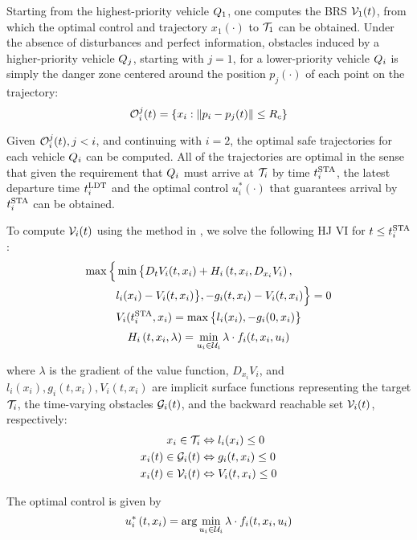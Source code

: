Starting from the highest-priority vehicle $Q_1$, one computes the BRS $\mathcal{V}_1(t)$, from which the optimal control and trajectory $x_1(\cdot)$ to $\mathcal{T}_1$ can be obtained. Under the absence of disturbances and perfect information, obstacles induced by a higher-priority vehicle $Q_j$, starting with $j=1$, for a lower-priority vehicle $Q_i$ is simply the danger zone centered around the position $p_j(\cdot)$ of each point on the trajectory:
\vspace{-0.5em} 
\begin{equation}
\mathcal{O}_i^j(t) = \{x_i: \|p_i - p_j(t)\|\le R_c\}
\end{equation}

Given $\mathcal{O}_i^j(t), j<i$, and continuing with $i = 2$, the optimal safe trajectories for each vehicle $Q_i$ can be computed. All of the trajectories are optimal in the sense that given the requirement that $Q_i$ must arrive at $\mathcal{T}_i$ by time $t^\text{STA}_i$, the latest departure time $t^\text{LDT}_i$ and the optimal control $u^*_i(\cdot)$ that guarantees arrival by $t^\text{STA}_i$ can be obtained.

To compute $\mathcal{V}_i(t)$ using the method in \cite{Fisac15}, we solve the following HJ VI for $t\le t^\text{STA}_i$:
\vspace{-0.5em} 
\begin{equation}
\label{eq:HJIVI}
\begin{aligned}
\max\Big\{&\min\big\{D_t V_i(t, x_i) + H_i\left(t, x_i, D_{x_i} V_i\right), \\
&l_i(x_i) - V_i(t, x_i)\big\}, -g_i(t, x_i) - V_i(t, x_i)\Big\} = 0 \\
&V_i(t^\text{STA}_i, x_i) = \max\big\{l_i(x_i), -g_i(0, x_i)\big\}\\ 
\end{aligned}
\end{equation}
\begin{equation}
\label{eq:basicSPPHam}
H_i\left(t, x_i, \lambda\right) = \min_{u_i \in \mathcal{U}_i} \lambda \cdot f_i(t, x_i, u_i)
\end{equation}

\noindent where $\lambda$ is the gradient of the value function, $D_{x_i} V_i$, and $l_i(x_i), g_i(t,x_i),V_i(t,x_i)$ are implicit surface functions representing the target $\mathcal{T}_i$, the time-varying obstacles $\mathcal{G}_i(t)$, and the backward reachable set $\mathcal{V}_i(t)$, respectively: 
\begin{equation}
\label{eq:impl_surf}
\begin{aligned}
x_i \in \mathcal{T}_i &\Leftrightarrow l_i(x_i) \le 0 \\
x_i(t) \in \mathcal{G}_i(t) &\Leftrightarrow g_i(t,x_i) \le 0 \\
x_i(t) \in \mathcal{V}_i(t) &\Leftrightarrow V_i(t, x_i) \le 0
\end{aligned}
\end{equation}

The optimal control is given by
 \vspace{-0.4em} 
\begin{equation}
\label{eq:optCtrl}
u^*_i\left(t, x_i\right) = \arg \min_{u_i \in \mathcal{U}_i} \lambda \cdot f_i(t, x_i, u_i)
\end{equation}